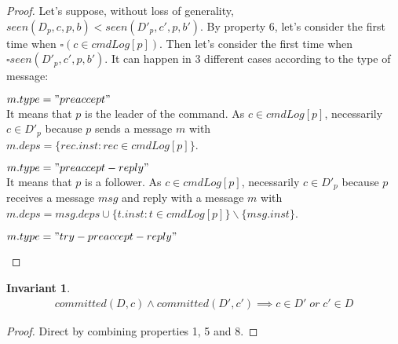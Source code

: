 \documentclass[a4paper]{article}
\theoremstyle{definition}
\theoremstyle{plain}
\newtheorem{invariant}{Invariant}
\begin{document}
\begin{proof}
Let's suppose, without loss of generality, $seen(D_p,c,p,b) < seen(D'_p,c',p,b')$.
By property 6, let's consider the first time when $\square(c \in cmdLog[p])$. Then let's consider the first time when $\square seen(D'_p,c',p,b')$. It can happen in 3 different cases according to the type of message:

\begin{case}
    \item $m.type = "preaccept"$ \\
    It means that $p$ is the leader of the command. As $c \in cmdLog[p]$, necessarily $c \in D'_p$ because $p$ sends a message $m$ with $m.deps = \{rec.inst : rec \in cmdLog[p]\}$.

    \item $m.type = "preaccept-reply"$ \\
    It means that $p$ is a follower. As $c \in cmdLog[p]$, necessarily $c \in D'_p$ because $p$ receives a message $msg$ and reply with a message $m$ with $m.deps = msg.deps \cup \{t.inst : t \in cmdLog[p]\}\backslash \{msg.inst\}$.

    \item $m.type = "try-preaccept-reply"$ \\
\end{case}

\end{proof}

\begin{invariant}
    \begin{align*}
    committed(D,c) \wedge committed(D',c') \implies c \in D' \; or \; c' \in D
    \end{align*}
\end{invariant}

\begin{proof}
Direct by combining properties 1, 5 and 8.
\end{proof}
\end{document}
